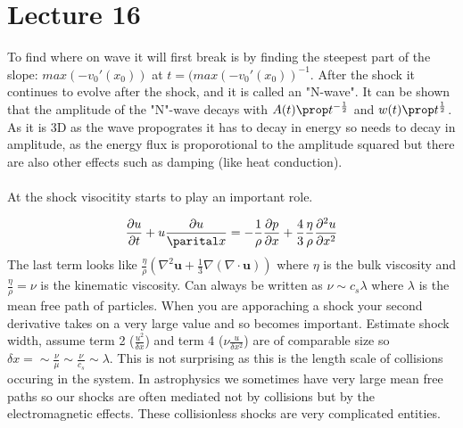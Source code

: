 \documentclass{article}
\begin{document}
\section{Lecture 16}
To find where on wave it will first break is by finding the steepest part of the slope: $max(- v_0'(x_0))$ at $t= (max(-v_0'(x_0))^{-1}$. After the shock it continues to evolve after the shock, and it is called an "N-wave". It can be shown that the amplitude of the "N"-wave decays with $A(t) \prop t^{-\frac{1}{2}}$ and $w(t) \prop t^{\frac{1}{2}}$. As it is 3D as the wave propogrates it has to decay in energy so needs to decay in amplitude, as the energy flux is proporotional to the amplitude squared but there are also other effects such as damping (like heat conduction).\\\\
At the shock visocitity starts to play an important role. 

$$
\frac{\partial u}{\partial t} + u \frac{\partial u}{\parital x} = - \frac{1}{\rho} \frac{\partial p}{\partial x} + \frac{4}{3} \frac{\eta}{\rho} \frac{\partial^2 u}{\partial x^2}
$$
The last term looks like $\frac{\eta}{\rho} (\nabla^2 \bm u + \frac{1}{3} \nabla(\nabla \cdot \bm u))$ where $\eta$ is the bulk viscosity and $\frac{\eta}{\rho}= \nu$ is the kinematic viscosity. Can always be written as $\nu \sim c_s \lambda$ where $\lambda$ is the mean free path of particles. When you are apporaching a shock your second derivative takes on a very large value and so becomes important. Estimate shock width, assume term 2 ($\frac{u^2}{\delta x}$) and term 4  ($\nu \frac{u}{\delta x^2}$) are of comparable size so $\delta x = \sim \frac{\nu}{\mu} \sim \frac{\nu}{c_s} \sim \lambda$. This is not surprising as this is the length scale of collisions occuring in the system. In astrophysics we sometimes have very large mean free paths so our shocks are often mediated not by collisions but by the electromagnetic effects. These collisionless shocks are very complicated entities.
\end{document}
